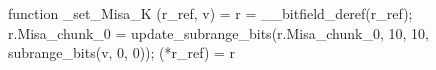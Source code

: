 function _set_Misa_K (r_ref, v) = {
    r = __bitfield_deref(r_ref);
    r.Misa_chunk_0 = update_subrange_bits(r.Misa_chunk_0, 10, 10, subrange_bits(v, 0, 0));
    (*r_ref) = r
}
